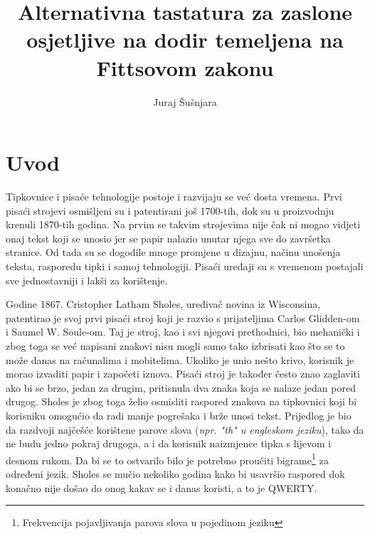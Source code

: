 \documentclass[times, utf8, zavrsni]{fer}
\begin{document}

\title{Alternativna tastatura za zaslone osjetljive na dodir temeljena na Fittsovom zakonu}

\author{Juraj Šušnjara}

\maketitle

\izvornik

\zahvala{}

\tableofcontents

\chapter{Uvod}

Tipkovnice i pisaće tehnologije postoje i razvijaju se već dosta vremena. Prvi pisaći strojevi osmišljeni su i patentirani još 1700-tih, dok su u proizvodnju krenuli 1870-tih godina. Na prvim se takvim strojevima nije čak ni mogao vidjeti onaj tekst koji se unosio jer se papir nalazio unutar njega sve do završetka stranice. Od tada su se dogodile mnoge promjene u dizajnu, načinu unošenja teksta, rasporedu tipki i samoj tehnologiji. Pisaći uređaji su s vremenom postajali sve jednostavniji i lakši za korištenje.

Godine 1867. Cristopher Latham Sholes, uređivač novina iz Wisconsina, patentirao je svoj prvi pisaći stroj koji je razvio s prijateljima Carlos Glidden-om i Saumel W. Soule-om. Taj je stroj, kao i svi njegovi prethodnici, bio mehanički i zbog toga se već napisani znakovi nisu mogli samo tako izbrisati kao što se to može danas na računalima i mobitelima. Ukoliko je unio nešto krivo, korisnik je morao izvaditi papir i započeti iznova. Pisaći stroj je također često znao zaglaviti ako bi se brzo, jedan za drugim, pritisnula dva znaka koja se nalaze jedan pored drugog. Sholes je zbog toga želio osmisliti raspored znakova na tipkovnici koji bi korisniku omogućio da radi manje pogrešaka i brže unosi tekst. Prijedlog je bio da razdvoji najčešće korištene parove slova (\emph{npr. "th" u engleskom jeziku}), tako da ne budu jedno pokraj drugoga, a i da korisnik naizmjence tipka s lijevom i desnom rukom. Da bi se to ostvarilo bilo je potrebno proučiti bigrame\footnote{Frekvencija pojavljivanja parova slova u pojedinom jeziku} za određeni jezik. Sholes se mučio nekoliko godina kako bi usavršio raspored dok konačno nije došao do onog kakav se i danas koristi, a to je QWERTY.
\end{document}
